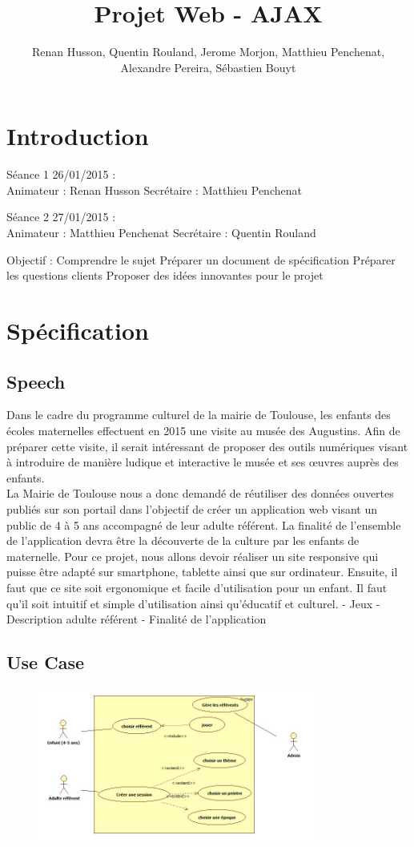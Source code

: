 \documentclass[12pt,a4paper]{report}
\author{Renan Husson, Quentin Rouland, Jerome Morjon, Matthieu Penchenat, Alexandre Pereira, Sébastien Bouyt}
\affil{Université Toulouse, Jean Jaurès - L3 MIASHS \\ Document D1 : Specification Fonctionnelle}
\begin{document}
\title{Projet Web - AJAX}
\maketitle
\renewcommand{\contentsname}{Sommaire}
\tableofcontents
\chapter*{Introduction}
Séance 1 26/01/2015 : \\
Animateur : Renan Husson
Secrétaire : Matthieu Penchenat
\newline

Séance 2 27/01/2015 : \\
Animateur : Matthieu Penchenat
Secrétaire : Quentin Rouland
\newline

Objectif :
Comprendre le sujet
Préparer un document de spécification
Préparer les questions clients
Proposer des idées innovantes pour le projet
\chapter{Spécification}
\section{Speech}
Dans le cadre du programme culturel de la mairie de Toulouse, les enfants des écoles maternelles effectuent en 2015 une visite au musée des Augustins. Afin de préparer cette visite, il serait intéressant de proposer des outils numériques visant à introduire de manière ludique et interactive le musée et ses œuvres auprès des enfants.\\
La Mairie de Toulouse nous a donc demandé de réutiliser des données ouvertes publiés sur son portail dans l'objectif de créer un application web visant un public de 4 à 5 ans accompagné de leur adulte référent. La finalité de l'ensemble de l'application devra être la découverte de la culture par les enfants de maternelle.
Pour ce projet, nous allons devoir réaliser un site responsive qui puisse être adapté sur smartphone, tablette ainsi que sur ordinateur. Ensuite, il faut que ce site soit ergonomique et facile d'utilisation pour un enfant. Il faut qu'il soit intuitif et simple d'utilisation ainsi qu'éducatif et culturel.
- Jeux
- Description adulte référent
- Finalité de l'application
\section{Use Case}
\begin{figure}[!h]
\centering
\includegraphics[width=350px]{uml.jpg}
\end{figure}
\end{document}
